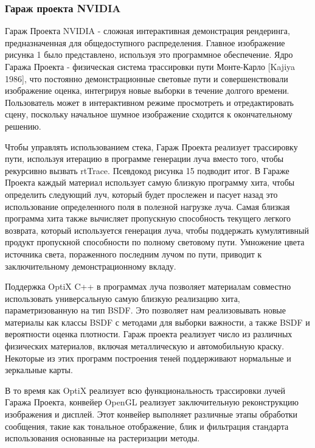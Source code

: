 \subsubsection{ Гараж проекта NVIDIA}
Гараж Проекта NVIDIA - сложная интерактивная демонстрация рендеринга, предназначенная для общедоступного распределения. Главное изображение рисунка 1 было представлено, используя это программное обеспечение. Ядро Гаража Проекта - физическая система трассировки пути Монте-Карло [Kajiya 1986], что постоянно демонстрационные световые пути и совершенствовали изображение оценка, интегрируя новые выборки в течение долгого времени. Пользователь может в интерактивном режиме просмотреть и отредактировать сцену, поскольку начальное шумное изображение сходится к окончательному решению.

Чтобы управлять использованием стека, Гараж Проекта реализует трассировку пути, используя итерацию в программе генерации луча вместо того, чтобы рекурсивно вызвать rtTrace. Псевдокод рисунка 15 подводит итог.
В Гараже Проекта каждый материал использует самую близкую программу хита, чтобы определить следующий луч, который будет прослежен и пасует назад это использование определенного поля в полезной нагрузке луча. Самая близкая программа хита также вычисляет пропускную способность текущего легкого возврата, который используется генерация луча, чтобы поддержать кумулятивный продукт пропускной способности по полному световому пути. Умножение цвета источника света, пораженного последним лучом по пути, приводит к заключительному демонстрационному вкладу.

Поддержка OptiX C++ в программах луча позволяет материалам совместно использовать универсальную самую близкую реализацию хита, параметризованную на тип BSDF. Это позволяет нам реализовывать новые материалы как классы BSDF с методами для выборки важности, а также BSDF и вероятности оценка плотности. Гараж проекта реализует число из различных физических материалов, включая металлическую и автомобильную краску. Некоторые из этих программ построения теней поддерживают нормальные и зеркальные карты.

В то время как OptiX реализует всю функциональность трассировки лучей Гаража Проекта, конвейер OpenGL реализует заключительную реконструкцию изображения и дисплей. Этот конвейер выполняет различные этапы обработки сообщения, такие как тональное отображение, блик и фильтрация стандарта использования основанные на растеризации методы.

